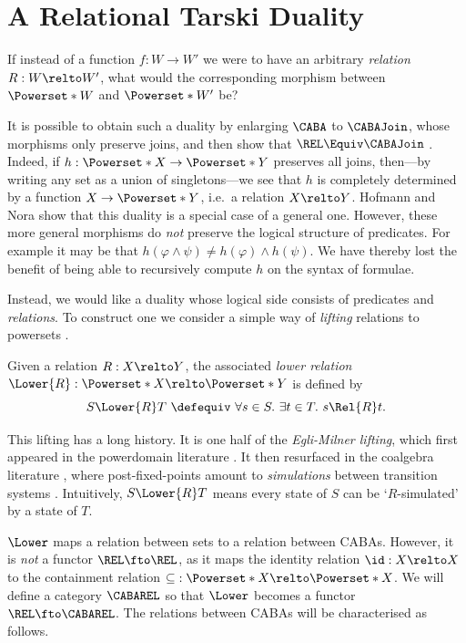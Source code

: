 \documentclass[a4paper,UKenglish,cleveref, autoref]{lipics-v2021}
\begin{document}
\section{A Relational Tarski Duality}\label{section:relational-tarski}

If instead of a function $f : W \to W'$ we were to have an arbitrary
\emph{relation} $R : W \relto W'$, what would the corresponding morphism between
$\Powerset*{W}$ and $\Powerset*{W'}$ be?

It is possible to obtain such a duality by enlarging $\CABA$ to $\CABAJoin$,
whose morphisms only preserve joins, and then show that $\REL \Equiv \CABAJoin$
\cite{jonsson_1951,scott_1980} \cite[\S 2.3]{kishida_2018}. Indeed, if $h :
\Powerset*{X} \to \Powerset*{Y}$ preserves all joins, then---by writing any set
as a union of singletons---we see that $h$ is completely determined by a
function $X \to \Powerset*{Y}$, i.e.\ a relation $X \relto Y$. Hofmann and Nora
\cite[\S 4.5]{hofmann_2015} show that this duality is a special case of a
general one. However, these more general morphisms do \emph{not} preserve the
logical structure of predicates. For example it may be that $h(\varphi \land
\psi) \neq h(\varphi) \land h(\psi)$. We have thereby lost the benefit of being
able to recursively compute $h$ on the syntax of formulae.

Instead, we would like a duality whose logical side consists of predicates and
\emph{relations}. To construct one we consider a simple way of \emph{lifting}
relations to powersets \cite{kurz_2016}.

\begin{definition}
  Given a relation \(R : X \relto Y\), the associated \emph{lower relation}
  \(\Lower{R} : \Powerset*{X} \relto \Powerset*{Y}\) is defined by
  \[
    S \Lower{R} T\ \defequiv\ \forall s \in S.\ \exists t \in T.\ s \Rel{R} t.
  \]
\end{definition}

This lifting has a long history. It is one half of the \emph{Egli-Milner
lifting}, which first appeared in the powerdomain literature
\cite{plotkin_1976,plotkin_1979}. It then resurfaced in the coalgebra literature
\cite{thijs_1996}, where post-fixed-points amount to \emph{simulations} between
transition systems \cite[\S 3]{jacobs_2016}. Intuitively, \(S \Lower{R} T\)
means every state of \(S\) can be `$R$-simulated' by a state of \(T\).

\(\Lower\) maps a relation between sets to a relation between CABAs. However, it
is \emph{not} a functor $\REL \fto \REL$, as it maps the identity relation \(\id :
X \relto X\) to the containment relation \(\mathbin{\subseteq} : \Powerset*{X}
\relto \Powerset*{X}\). We will define a category \(\CABAREL\) so that
\(\Lower\) becomes a functor \(\REL \fto \CABAREL\). The relations between CABAs
will be characterised as follows.
\end{document}
